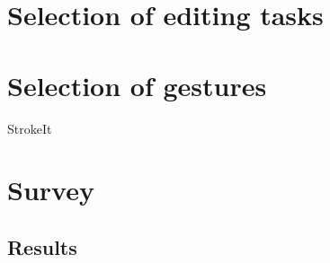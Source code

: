 \documentclass{aes130}
\begin{document}
\section{Selection of editing tasks} \label{sec:EditingTasks}



\section{Selection of gestures} \label{sec:Gestures}

\newcommand{\quarterpic}[1][]{\texttt{[image: ../../de/Befragung/img/\#1]}}
\newcommand{\sixthpic}[1][]{\texttt{[image: ../../de/Befragung/img/\#1]}}


StrokeIt


\section{Survey} \label{sec:Survey}


\subsection{Results} \label{sec:SurveyResults}
\end{document}
